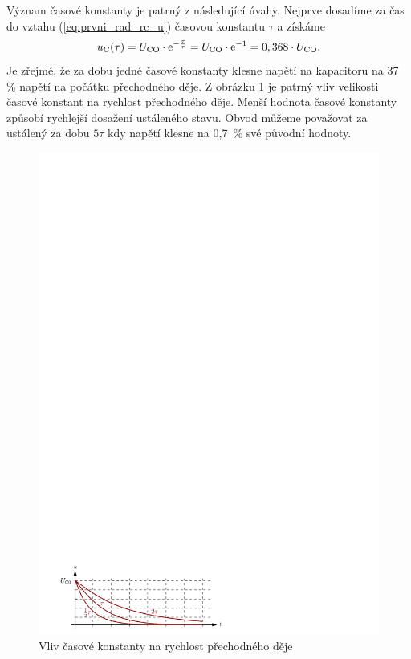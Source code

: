 Význam časové konstanty je patrný z následující úvahy. Nejprve dosadíme za čas do vztahu (\ref{eq:prvni_rad_rc_u}) časovou konstantu $\tau$ a získáme
$$
u_\mathrm{C}(\tau) = U_\mathrm{CO} \cdot \mathrm{e}^{-\frac{\tau}{\tau}} = U_\mathrm{CO} \cdot \mathrm{e}^{-1} = 0,368 \cdot U_\mathrm{CO}.
$$
Je zřejmé, že za dobu jedné časové konstanty klesne napětí na kapacitoru na 37 \% napětí na počátku přechodného děje. Z obrázku \ref{fig:prvni_rad_rc_graf_tau} je patrný vliv velikosti časové konstant na rychlost přechodného děje. Menší hodnota časové konstanty způsobí rychlejší dosažení ustáleného stavu. Obvod můžeme považovat za ustálený za dobu $5\tau$ kdy napětí klesne na 0,7~\% své původní hodnoty.
\begin{figure}[h!]
\centering
\includegraphics[]{prechodne_jevy/prvni_rad/rc_graf_tau.pdf}
\caption{Vliv časové konstanty na rychlost přechodného děje}
\label{fig:prvni_rad_rc_graf_tau}
\end{figure}

